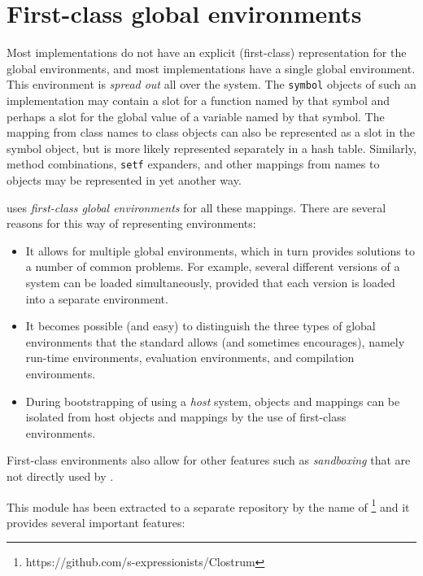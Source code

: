\chapter{First-class global environments}

Most \commonlisp{} implementations do not have an explicit
(first-class) representation for the global environments, and most
\commonlisp{} implementations have a single global environment.  This
environment is \emph{spread out} all over the system.  The
\texttt{symbol} objects of such an implementation may contain a slot
for a function named by that symbol and perhaps a slot for the global
value of a variable named by that symbol.  The mapping from class
names to class objects can also be represented as a slot in the symbol
object, but is more likely represented separately in a hash table.
Similarly, method combinations, \texttt{setf} expanders, and other
mappings from names to objects may be represented in yet another way.

\sysname{} uses \emph{first-class global environments} for all these
mappings.  There are several reasons for this way of representing
environments:

\begin{itemize}
\item It allows for multiple global environments, which in turn
  provides solutions to a number of common problems.  For example,
  several different versions of a system can be loaded simultaneously,
  provided that each version is loaded into a separate environment.
\item It becomes possible (and easy) to distinguish the three types of
  global environments that the \commonlisp{} standard allows (and
  sometimes encourages), namely run-time environments, evaluation
  environments, and compilation environments.
\item During bootstrapping of \sysname{} using a \emph{host}
  \commonlisp{} system, \sysname{} objects and mappings can be
  isolated from host objects and mappings by the use of first-class
  environments.
\end{itemize}

First-class environments also allow for other features such as
\emph{sandboxing} that are not directly used by \sysname{}.

This module has been extracted to a separate repository by the name of
\clostrum{}%
\footnote{https://github.com/s-expressionists/Clostrum} and it
provides several important features:

